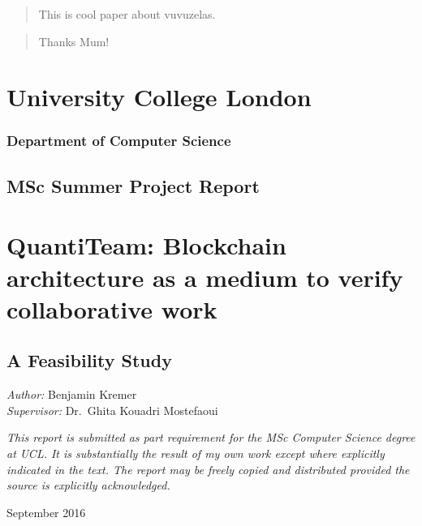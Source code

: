 \begin{abstract}
 This is cool paper about vuvuzelas.
\end{abstract}

\renewcommand{\abstractname}{Acknowledgements}
\begin{abstract}
 Thanks Mum!
\end{abstract}

\setcounter{tocdepth}{3}

\tableofcontents
\listoffigures
\listoftables

\section{University College London}\label{university-college-london}

\subsubsection{Department of Computer
Science}\label{department-of-computer-science}

\subsection{MSc Summer Project Report}\label{msc-summer-project-report}

\section{QuantiTeam: Blockchain architecture as a medium to verify
collaborative
work}\label{quantiteam-blockchain-architecture-as-a-medium-to-verify-collaborative-work}

\subsection{A Feasibility Study}\label{a-feasibility-study}

\emph{Author:} Benjamin Kremer\\
\emph{Supervisor:} Dr.~Ghita Kouadri Mostefaoui

\emph{This report is submitted as part requirement for the MSc Computer
Science degree at UCL. It is substantially the result of my own work
except where explicitly indicated in the text. The report may be freely
copied and distributed provided the source is explicitly acknowledged.}

September 2016

